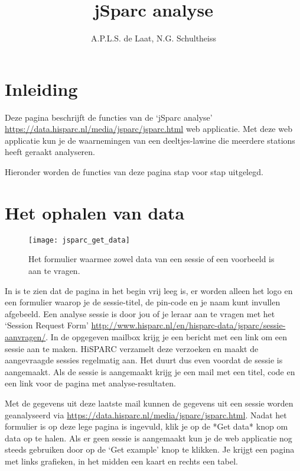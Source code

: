 

\title{jSparc analyse}
\author{A.P.L.S. de Laat, N.G. Schultheiss}



\maketitle

\section{Inleiding}

Deze pagina beschrijft de functies van de `jSparc analyse' 
\url{https://data.hisparc.nl/media/jsparc/jsparc.html} web
applicatie. Met deze web applicatie kun je de waarnemingen van een 
deeltjes-lawine die meerdere stations heeft geraakt analyseren.

Hieronder worden de functies van deze pagina stap voor stap uitgelegd.

\section{Het ophalen van data}

\begin{figure}[H]
    \centering
    \texttt{[image: jsparc\_get\_data]}
    \caption{Het formulier waarmee zowel data van een sessie of een voorbeeld is aan te 
   		vragen.}
    \label{fig:get_data}
\end{figure}

In  is te zien dat de pagina in het begin vrij leeg is, er worden alleen het \hisparc logo en een
formulier waarop je de sessie-titel, de pin-code en je naam kunt invullen 
afgebeeld. Een analyse sessie is door jou of je leraar aan te vragen met het 
`Session Request Form'
\url{http://www.hisparc.nl/en/hisparc-data/jsparc/sessie-aanvragen/}. In de opgegeven mailbox krijg je een bericht met een link om een sessie aan te maken. HiSPARC verzamelt deze verzoeken en maakt de aangevraagde sessies regelmatig aan. Het duurt dus even voordat de sessie is aangemaakt. Als de sessie is aangemaakt krijg je een mail met een titel, code en een link voor de pagina met analyse-resultaten.

Met de gegevens uit deze laatste mail kunnen de gegevens uit een sessie worden geanalyseerd via \url{https://data.hisparc.nl/media/jsparc/jsparc.html}. Nadat het formulier is op deze lege pagina is ingevuld, klik je op de *Get data* knop 
om data op te halen. Als er geen sessie is aangemaakt kun je de web applicatie 
nog steeds gebruiken door op de `Get example' knop te klikken. Je krijgt een pagina met links grafieken, in het midden een kaart en rechts een tabel.

